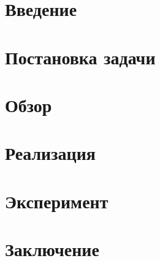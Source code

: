 




\usepackage{totcount}
\usepackage{placeins}

\usepackage{pseudocode}
\usepackage{caption}
\usepackage{listings}

\usepackage{algorithm,algpseudocode}
\usepackage{amsmath}




\maketitle
\setcounter{tocdepth}{2}
\tableofcontents


\section*{Введение}


\section{Постановка задачи}


\section{Обзор}


\section{Реализация}


\section{Эксперимент}


\section*{Заключение}


\setmonofont[Mapping=tex-text]{CMU Typewriter Text}
  
  

